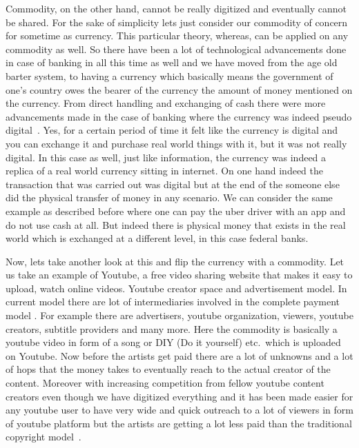 Commodity, on the other hand, cannot be really digitized and
eventually cannot be shared. For the sake of simplicity lets just
consider our commodity of concern for sometime as currency. This
particular theory, whereas, can be applied on any commodity as well.
So there have been a lot of technological advancements done in case of
banking in all this time as well and we have moved from the age old
barter system, to having a currency which basically means the
government of one's country owes the bearer of the currency the amount
of money mentioned on the currency. From direct handling and
exchanging of cash there were more advancements made in the case of
banking where the currency was indeed pseudo digital~\cite{Chen7}.
Yes, for a certain period of time it felt like the currency is digital
and you can exchange it and purchase real world things with it, but it
was not really digital. In this case as well, just like information,
the currency was indeed a replica of a real world currency sitting in
internet. On one hand indeed the transaction that was carried out was
digital but at the end of the someone else did the physical transfer
of money in any scenario. We can consider the same example as
described before where one can pay the uber driver with an app and do
not use cash at all. But indeed there is physical money that exists in
the real world which is exchanged at a different level, in this case
federal banks.

Now, lets take another look at this and flip the currency with a
commodity. Let us take an example of Youtube,  a free
  video sharing website that makes it easy to upload, watch online
  videos. Youtube creator space and advertisement model. In current model
there are lot of intermediaries involved in the complete payment model
\cite{bryanm8}. For example there are advertisers, youtube
organization, viewers, youtube creators, subtitle providers and many
more. Here the commodity is basically a youtube video in form of a
song or DIY (Do it yourself) etc.\ which is uploaded on Youtube. Now
before the artists get paid there are a lot of unknowns and a lot of
hops that the money takes to eventually reach to the actual creator of
the content. Moreover with increasing competition from fellow youtube
content creators even though we have digitized everything and it has
been made easier for any youtube user to have very wide and quick
outreach to a lot of viewers in form of youtube platform but the
artists are getting a lot less paid than the traditional copyright
model~\cite{tapscott1,helienne9}.


